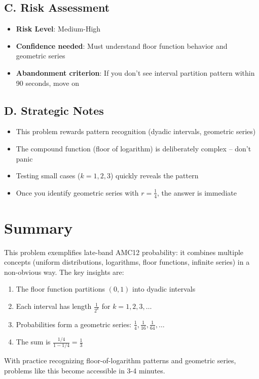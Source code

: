 \documentclass[11pt]{article}
\begin{document}
\begin{competitionbox}
\subsection*{C. Risk Assessment}
\begin{itemize}[leftmargin=*]
    \item \textbf{Risk Level}: Medium-High
    \item \textbf{Confidence needed}: Must understand floor function behavior and geometric series
    \item \textbf{Abandonment criterion}: If you don't see interval partition pattern within 90 seconds, move on
\end{itemize}

\subsection*{D. Strategic Notes}
\begin{itemize}[leftmargin=*]
    \item This problem rewards pattern recognition (dyadic intervals, geometric series)
    \item The compound function (floor of logarithm) is deliberately complex -- don't panic
    \item Testing small cases ($k=1, 2, 3$) quickly reveals the pattern
    \item Once you identify geometric series with $r = \frac{1}{4}$, the answer is immediate
\end{itemize}
\end{competitionbox}

\section*{Summary}

This problem exemplifies late-band AMC12 probability: it combines multiple concepts (uniform distributions, logarithms, floor functions, infinite series) in a non-obvious way. The key insights are:
\begin{enumerate}
    \item The floor function partitions $(0,1)$ into dyadic intervals
    \item Each interval has length $\frac{1}{2^k}$ for $k = 1, 2, 3, \ldots$
    \item Probabilities form a geometric series: $\frac{1}{4}, \frac{1}{16}, \frac{1}{64}, \ldots$
    \item The sum is $\frac{1/4}{1-1/4} = \frac{1}{3}$
\end{enumerate}

With practice recognizing floor-of-logarithm patterns and geometric series, problems like this become accessible in 3-4 minutes.
\end{document}
